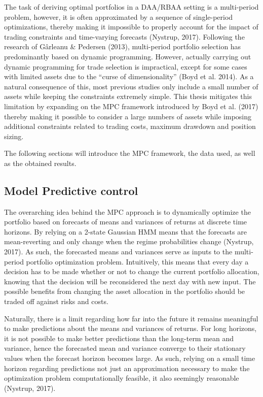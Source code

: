 The task of deriving optimal portfolios in a DAA/RBAA setting is a multi-period problem, however, it is often approximated by a sequence of single-period optimizations, thereby making it impossible to
properly account for the impact of trading constraints and time-varying forecasts (Nystrup, 2017). Following the research of Gârleanu \&
Pedersen (2013), multi-period portfolio selection has predominantly based on dynamic programming. However, actually carrying out dynamic programming for trade selection is impractical, except for
some cases with limited assets due to the “curse of dimensionality” (Boyd et al. 2014). As a natural consequence of this, most previous studies only include a small number of assets while keeping the constraints extremely simple. This thesis mitigates this limitation by expanding on the MPC framework introduced by Boyd et al. (2017) thereby making it possible to consider a large numbers of assets
while imposing additional constraints related to trading costs, maximum drawdown and position sizing.

The following sections will introduce the MPC framework, the data used, as well as the obtained results.

\subsection{Model Predictive control}
The overarching idea behind the MPC approach is to dynamically optimize the portfolio based on forecasts of
means and variances of returns at discrete time horizons. By relying on a 2-state Gaussian HMM means that the forecasts are mean-reverting and
only change when the regime probabilities change (Nystrup, 2017). As such, the forecasted means and variances serve as inputs to the multi-period portfolio optimization problem. Intuitively, this means that every day a decision has to be made whether or not to change the current portfolio allocation, knowing that the decision will be reconsidered the next day with new input. The possible benefits from changing the asset allocation in the portfolio should be traded off against risks and costs. 

Naturally, there is a limit regarding how far into the future it remains meaningful to make predictions about the means and variances of returns. For long horizons, it is not possible to make better predictions than
the long-term mean and variance, hence the forecasted mean and variance converge to their stationary values when the forecast horizon becomes large. As such, relying on a small time horizon regarding predictions not just
an approximation necessary to make the optimization problem computationally
feasible, it also seemingly reasonable (Nystrup, 2017).

